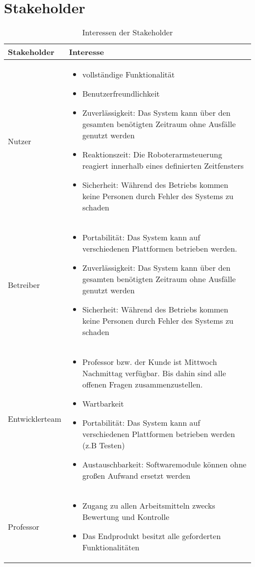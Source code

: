 \clearpage
\section{Stakeholder}
\begin{table}[h!]
	\caption{Interessen der Stakeholder}
	\label{tab:stakeholder}
	\centering
	\begin{tabular}{|p{2.5cm}|p{10cm}|}
		\hline
		\textbf{Stakeholder} & \textbf{Interesse}  \\
		\hline
		Nutzer   
		& \parbox{10cm}{\begin{itemize}
			\item vollständige Funktionalität
			\item Benutzerfreundlichkeit
			\item Zuverlässigkeit: Das System kann über den gesamten benötigten Zeitraum ohne Ausfälle genutzt werden
			\item Reaktionszeit: Die Roboterarmsteuerung reagiert innerhalb eines definierten Zeitfensters
			\item Sicherheit: Während des Betriebs kommen keine Personen durch Fehler des Systems zu schaden
		\end{itemize}}
		\\
		\hline
		Betreiber 
		&\parbox{10cm}{
			\begin{itemize}
			\item Portabilität: Das System kann auf verschiedenen Plattformen betrieben werden.
			\item Zuverlässigkeit: Das System kann über den gesamten benötigten Zeitraum ohne Ausfälle genutzt werden
			\item Sicherheit: Während des Betriebs kommen keine Personen durch Fehler des Systems zu schaden
			\end{itemize}}
		\\
		\hline
		Entwicklerteam 
		&\parbox{10cm}{ \begin{itemize}
			\item Professor bzw. der \glqq Kunde\grqq{} ist Mittwoch Nachmittag verfügbar. Bis dahin sind alle offenen Fragen zusammenzustellen.
			\item Wartbarkeit
			\item Portabilität: Das System kann auf verschiedenen Plattformen betrieben werden (z.B Testen)
			\item Austauschbarkeit: Softwaremodule können ohne großen Aufwand ersetzt werden
		\end{itemize}}
		\\
		\hline
		Professor & \parbox{10cm}{\begin{itemize}
			\item Zugang zu allen Arbeitsmitteln zwecks Bewertung und Kontrolle
			\item Das Endprodukt besitzt alle geforderten Funktionalitäten
		\end{itemize}}
		\\
		\hline
	\end{tabular}
\end{table}




